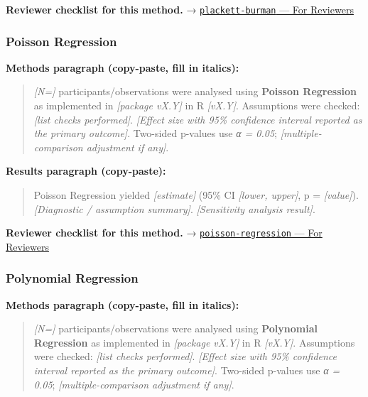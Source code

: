 \documentclass[
]{article}
\begin{document}
\textbf{Reviewer checklist for this method.} →
\href{../chapters/16-design/plackett-burman.Rmd\#for-reviewers}{\texttt{plackett-burman}
--- For Reviewers}

\subsubsection{Poisson Regression}\label{poisson-regression}

\textbf{Methods paragraph (copy-paste, fill in italics):}

\begin{quote}
\emph{{[}N={]}} participants/observations were analysed using
\textbf{Poisson Regression} as implemented in \emph{{[}package vX.Y{]}}
in R \emph{{[}vX.Y{]}}. Assumptions were checked: \emph{{[}list checks
performed{]}}. \emph{{[}Effect size with 95\% confidence interval
reported as the primary outcome{]}}. Two-sided p-values use \emph{α =
0.05}; \emph{{[}multiple-comparison adjustment if any{]}}.
\end{quote}

\textbf{Results paragraph (copy-paste):}

\begin{quote}
Poisson Regression yielded \emph{{[}estimate{]}} (95\% CI
\emph{{[}lower, upper{]}}, p = \emph{{[}value{]}}). \emph{{[}Diagnostic
/ assumption summary{]}}. \emph{{[}Sensitivity analysis result{]}}.
\end{quote}

\textbf{Reviewer checklist for this method.} →
\href{../chapters/07-regression/poisson-regression.Rmd\#for-reviewers}{\texttt{poisson-regression}
--- For Reviewers}

\subsubsection{Polynomial Regression}\label{polynomial-regression}

\textbf{Methods paragraph (copy-paste, fill in italics):}

\begin{quote}
\emph{{[}N={]}} participants/observations were analysed using
\textbf{Polynomial Regression} as implemented in \emph{{[}package
vX.Y{]}} in R \emph{{[}vX.Y{]}}. Assumptions were checked: \emph{{[}list
checks performed{]}}. \emph{{[}Effect size with 95\% confidence interval
reported as the primary outcome{]}}. Two-sided p-values use \emph{α =
0.05}; \emph{{[}multiple-comparison adjustment if any{]}}.
\end{quote}
\end{document}
